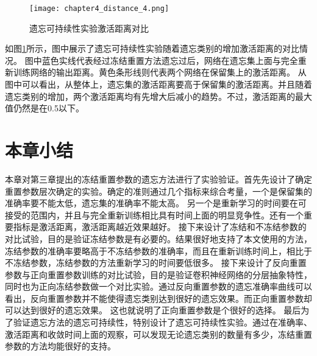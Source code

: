 \begin{figure}
    \centering
    \texttt{[image: chapter4\_distance\_4.png]}
    \caption{遗忘可持续性实验激活距离对比}
    \label{fig:chapter4_distance_4}
\end{figure}

如图\ref{fig:chapter4_distance_4}所示，图中展示了遗忘可持续性实验随着遗忘类别的增加激活距离的对比情况。
图中蓝色实线代表经过冻结重置方法遗忘过后，网络在遗忘集上面与完全重新训练网络的输出距离。黄色条形线则代表两个网络在保留集上的激活距离。
从图中可以看出，从整体上，遗忘集的激活距离要高于保留集的激活距离。并且随着遗忘类别的增加，两个激活距离均有先增大后减小的趋势。不过，激活距离的最大值仍然是在0.5以下。

\section{本章小结}
本章对第三章提出的冻结重置参数的遗忘方法进行了实验验证。首先先设计了确定重置参数层次确定的实验。确定的准则通过几个指标来综合考量，一个是保留集的准确率要不能太低，遗忘集的准确率不能太高。
另一个是重新学习的时间要在可接受的范围内，并且与完全重新训练相比具有时间上面的明显竞争性。还有一个重要指标是激活距离，激活距离越近效果越好。
接下来设计了冻结和不冻结参数的对比试验，目的是验证冻结参数是有必要的。结果很好地支持了本文使用的方法，冻结参数的准确率要略高于不冻结参数的准确率，而且在重新训练时间上，相比于不冻结参数，冻结参数的方法重新学习的时间要低很多。
接下来设计了反向重置参数与正向重置参数训练的对比试验，目的是验证卷积神经网络的分层抽象特性，同时也为正向冻结参数做一个对比实验。通过反向重置参数的遗忘准确率曲线可以看出，反向重置参数并不能使得遗忘类别达到很好的遗忘效果。而正向重置参数却可以达到很好的遗忘效果。
这也就说明了正向重置参数是个很好的选择。
最后为了验证遗忘方法的遗忘可持续性，特别设计了遗忘可持续性实验。通过在准确率、激活距离和收敛时间上面的观察，可以发现无论遗忘类别的数量有多少，冻结重置参数的方法均能很好的支持。

